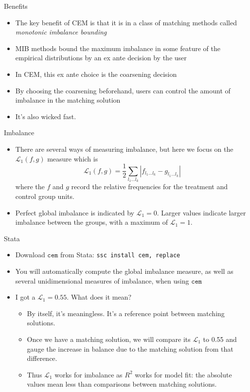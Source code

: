 \documentclass{beamer}
\begin{document}
\begin{frame}{Benefits}
	
	\begin{itemize}
	\item The key benefit of CEM is that it is in a class of matching methods called \emph{monotonic imbalance bounding}
	\item MIB methods bound the maximum imbalance in some feature of the empirical distributions by an ex ante decision by the user
	\item In CEM, this ex ante choice is the coarsening decision
	\item By choosing the coarsening beforehand, users can control the amount of imbalance in the matching solution
	\item It's also wicked fast.
	\end{itemize}
\end{frame}


\begin{frame}{Imbalance}
	
	\begin{itemize}
	\item There are several ways of measuring imbalance, but here we focus on the $\mathcal{L}_1(f,g)$ measure which is$$\mathcal{L}_1(f,g) = \frac{1}{2} \sum_{l_1 \dots l_k} | f_{l_1 \dots l_k} - g_{l_1 \dots l_k} |$$where the $f$ and $g$ record the relative frequencies for the treatment and control group units.
	\item Perfect global imbalance is indicated by $\mathcal{L}_1=0$.  Larger values indicate larger imbalance between the groups, with a maximum of $\mathcal{L}_1=1$. 
	\end{itemize}
\end{frame}

\begin{frame}{Stata}
	
	\begin{itemize}
	\item Download $\texttt{cem}$ from Stata:  \texttt{ssc install cem, replace}
	\item You will automatically compute the global imbalance measure, as well as several unidimensional measures of imbalance, when using $\texttt{cem}$
	\item I got a $\mathcal{L}_1=0.55$.  What does it mean?
		\begin{itemize}
		\item By itself, it's meaningless.  It's a reference point between matching solutions.
		\item Once we have a matching solution, we will compare its $\mathcal{L}_1$ to 0.55 and gauge the increase in balance due to the matching solution from that difference.
		\item Thus $\mathcal{L}_1$ works for imbalance as $R^2$ works for model fit: the absolute values mean less than comparisons between matching solutions.
		\end{itemize}
	\end{itemize}
	
\end{frame}
\end{document}
